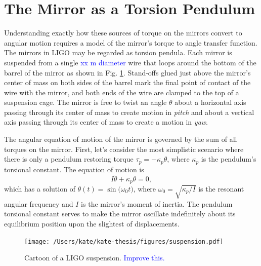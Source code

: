 \section{The Mirror as a Torsion Pendulum}
\label{sec:pendTF}
Understanding exactly how these sources of torque on the mirrors convert to angular motion requires a model of the mirror's torque to angle transfer function.
The mirrors in LIGO may be regarded as torsion pendula. Each mirror is
suspended from a single \textcolor{blue}{xx m diameter} wire that
loops around the bottom of the barrel of the mirror as shown in
Fig. \ref{fig:suspension}. Stand-offs glued just above the mirror's
center of mass on both sides of the barrel mark the final point of
contact of the wire with the mirror, and both ends of the wire are
clamped to the top of a suspension cage. The mirror is free to twist
an angle $\theta$ about a horizontal axis passing through its center
of mass to create motion in \emph{pitch} and about a vertical axis
passing through its center of mass to create a motion in \emph{yaw}.

The angular equation of motion of the mirror is governed by the sum of
all torques on the mirror. First, let's consider the most simplistic
scenario where there is only a pendulum restoring torque
$\tau_p=-\kappa_p \theta$, where $\kappa_p$ is the pendulum's
torsional constant. The equation of motion is
\begin{equation}
I \ddot{\theta} + \kappa_p \theta = 0,
\end{equation}
which has a solution of $\theta(t) = \sin({\omega_0 t)}$, where
$\omega_0 = \sqrt{\kappa_p/I}$ is the resonant angular frequency and
$I$ is the mirror's moment of inertia. The pendulum torsional constant
serves to make the mirror oscillate indefinitely about its equilibrium
position upon the slightest of displacements.

\begin{figure}
\begin{centering}
\texttt{[image: /Users/kate/kate-thesis/figures/suspension.pdf]}
\caption[Sketch of a LIGO suspension]{Cartoon of a LIGO
  suspension. \textcolor{blue}{Improve this.}}
\label{fig:suspension}
\end{centering}
\end{figure}





